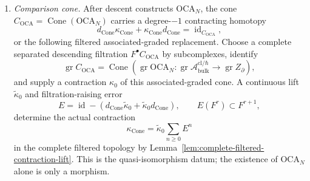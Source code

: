\begin{defn}
\begin{enumerate}[label=\textup{(D\arabic*)}]
  \item \emph{Comparison cone.}
    After descent constructs \(\mathrm{OCA}_N\), the cone
    \(C_{\mathrm{OCA}}=\operatorname{Cone}(\mathrm{OCA}_N)\) carries a
    degree-\(-1\) contracting homotopy
    \[
      d_{\operatorname{Cone}}\kappa_{\operatorname{Cone}}
      +\kappa_{\operatorname{Cone}}d_{\operatorname{Cone}}
      =
      \operatorname{id}_{C_{\mathrm{OCA}}},
    \]
    or the following filtered associated-graded replacement.  Choose a
    complete separated descending filtration \(F^\bullet C_{\mathrm{OCA}}\)
    by subcomplexes, identify
    \[
      \operatorname{gr}C_{\mathrm{OCA}}
      =
      \operatorname{Cone}\!\left(
      \operatorname{gr}\mathrm{OCA}_N\colon
      \operatorname{gr}\mathcal A^{\mathrm{cl}/\hbar}_{\mathrm{bulk}}
      \to\operatorname{gr}Z_\partial\right),
    \]
    and supply a contraction \(\kappa_0\) of this associated-graded cone.
    A continuous lift \(\widetilde\kappa_0\) and filtration-raising error
    \[
      E=\operatorname{id}-
      (d_{\operatorname{Cone}}\widetilde\kappa_0
      +\widetilde\kappa_0d_{\operatorname{Cone}}),
      \qquad E(F^r)\subset F^{r+1},
    \]
    determine the actual contraction
    \[
      \kappa_{\operatorname{Cone}}
      =
      \widetilde\kappa_0\sum_{n\ge0}E^n
    \]
    in the complete filtered topology by
    Lemma~\ref{lem:complete-filtered-contraction-lift}.  This is the
    quasi-isomorphism datum; the existence of \(\mathrm{OCA}_N\) alone is
    only a morphism.
\end{enumerate}
\end{defn}

